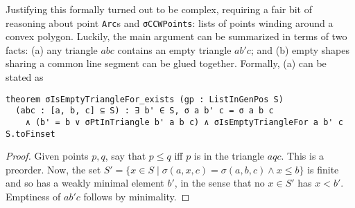 Justifying this formally turned out to be complex,
requiring a fair bit of reasoning about point \lstinline|Arc|s
and \lstinline|σCCWPoints|: lists of points winding around a convex polygon.
Luckily, the main argument can be summarized in terms of two facts:
(a) any triangle $abc$ contains an empty triangle $ab'c$; and
(b) empty shapes sharing a common line segment can be glued together.
Formally, (a) can be stated as

\begin{lstlisting}
theorem σIsEmptyTriangleFor_exists (gp : ListInGenPos S)
  (abc : [a, b, c] ⊆ S) : ∃ b' ∈ S, σ a b' c = σ a b c
    ∧ (b' = b ∨ σPtInTriangle b' a b c) ∧ σIsEmptyTriangleFor a b' c S.toFinset
\end{lstlisting}
\begin{proof}
  Given points $p,q$, say that $p \leq q$ iff $p$ is in the triangle $aqc$.
  This is a preorder.
  Now, the set $S' = \{x \in S \mid \sigma(a,x,c) = \sigma(a,b,c) \wedge x \leq b\}$
  is finite and so has a weakly minimal element $b'$,
  in the sense that no $x \in S'$ has $x < b'$.
  Emptiness of $ab'c$ follows by minimality.
\end{proof}

